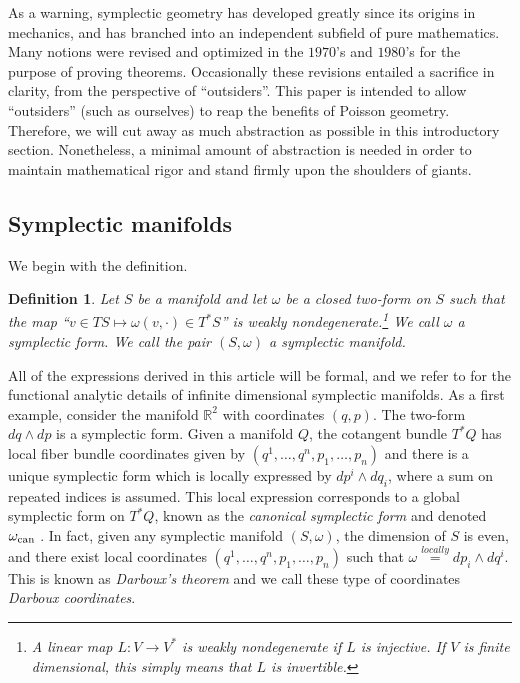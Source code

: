 \documentclass[12pt]{amsart}
\newcommand{\R}{\ensuremath{\mathbb{R}}}
\newtheorem{defn}[thm]{Definition}
\begin{document}
As a warning, symplectic geometry has developed greatly
since its origins in mechanics, and
has branched into an independent subfield of pure mathematics.
Many notions were revised and optimized in the $1970$'s and $1980$'s for
the purpose of proving theorems.
Occasionally these revisions entailed a sacrifice
in clarity, from the perspective of ``outsiders''.
This paper is intended to allow ``outsiders''
(such as ourselves) to reap the benefits of Poisson geometry.
Therefore, we will cut away as much abstraction as possible in this introductory
section.
Nonetheless, a minimal amount of abstraction is needed in order to
maintain mathematical rigor and stand firmly upon the shoulders of giants.

\subsection{Symplectic manifolds}
\label{sec:Symplectic}
We begin with the definition.
\begin{defn}
  Let $S$ be a manifold
  and let $\omega$ be a closed two-form on $S$ such that the map
  ``$v \in TS \mapsto \omega( v , \cdot ) \in T^*S$'' is weakly nondegenerate.\footnote{
    A linear map $L:V \to V^*$ is \emph{weakly nondegenerate} if $L$ is injective.  If $V$ is finite dimensional, this simply means that $L$ is invertible.}
  We call $\omega$ a \emph{symplectic form}.
  We call the pair $(S,\omega)$ a \emph{symplectic manifold}.
\end{defn}
All of the expressions derived in this article will be formal, and we refer to \cite{GayBalmazVizman2012}
for the functional analytic details of infinite dimensional symplectic manifolds.
As a first example, consider the manifold $\R^2$
with coordinates $(q,p)$.
The two-form $dq \wedge dp$ is a symplectic form.
Given a manifold $Q$,
the cotangent bundle $T^*Q$ has local fiber bundle coordinates
given by $(q^1,\dots, q^n,p_1,\dots,p_n)$ and there is a unique symplectic form
which is locally expressed by $dp^i \wedge dq_i$, where
a sum on repeated indices is assumed.
This local expression corresponds to a global symplectic
form on $T^*Q$, known as the \emph{canonical symplectic form}
and denoted $\omega_{\rm can}$ \cite[Theorem 3.2.10]{FOM}.
In fact, given any symplectic manifold $(S,\omega)$, the dimension of $S$
is even, and there exist local coordinates $(q^1,\dots,q^n,p_1,\dots,p_n)$
such that $\omega \stackrel{locally}{=} dp_i \wedge dq^i$.
This is known as \emph{Darboux's theorem} and we call these type of
coordinates \emph{Darboux coordinates}\cite[Theorem 3.2.2]{FOM}.
\end{document}
